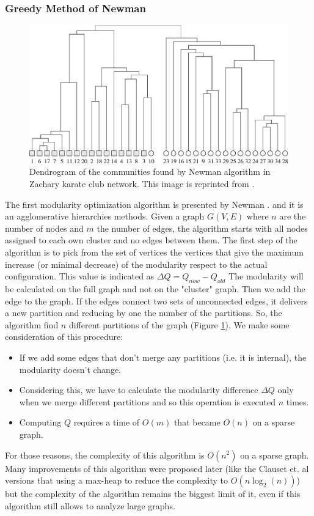 \subsubsection{Greedy Method of Newman}
\begin{figure}[h]
	\centering
	\includegraphics[width=0.7\linewidth]{0-resources/zachary}
	\caption{Dendrogram of the communities found by Newman algorithm in Zachary karate club network. This image is reprinted from \cite{Newman_2004}.}
	\label{fig:dedro_zachary}
\end{figure}
The first modularity optimization algorithm is presented by Newman \cite{Newman_2004}.
and it is an agglomerative hierarchies methods. Given a graph $G(V,E)$ where $n$ are the number of nodes and $m$ the number of edges, the algorithm starts with all nodes assigned to each own cluster and no edges between them. The first step of the algorithm is to pick from the set of vertices the vertices that give the maximum increase (or minimal decrease) of the modularity respect to the actual configuration. This value is indicated as $\Delta Q = Q_{now} - Q_{old}$ The modularity will be calculated on the full graph and not on the "cluster" graph. Then we add the edge to the graph. If the edges connect two sets of unconnected edges, it delivers a new partition and reducing by one the number of the partitions. So, the algorithm find $n$ different partitions of the graph (Figure \ref{fig:dedro_zachary}). 
We make some consideration of this procedure:
\begin{itemize}
\item If we add some edges that don't merge any partitions (i.e. it is internal), the modularity doesn't change.
\item Considering this, we have to calculate the modularity difference $\Delta Q$ only when we merge different partitions and so this operation is executed $n$ times.
\item Computing $Q$ requires a time of $O(m)$ that became $O(n)$ on a sparse graph.
\end{itemize}
For those reasons, the complexity of this algorithm is $O(n^2)$ on a sparse graph.
Many improvements of this algorithm were proposed later (like the Clauset et. al versions \cite{Clauset_2004} that using a max-heap to reduce the complexity to $O(n \log_2(n))$) but the complexity of the algorithm remains the biggest limit of it, even if this algorithm still allows to analyze large graphs.
